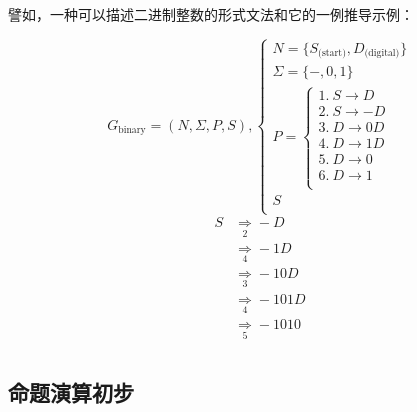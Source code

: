 譬如，一种可以描述二进制整数的形式文法和它的一例推导示例：
\begin{multicols}{2}
    \begin{equation*}
        G_\text{binary} = (N, \Sigma, P, S), \begin{cases}
            N      = \{ S_\text{(start)}, D_\text{(digital)} \} \\
            \Sigma = \{ -, 0, 1 \}                              \\
            P      = \begin{cases}
                         \text{1.}\ S \to D  \\
                         \text{2.}\ S \to -D \\
                         \text{3.}\ D \to 0D \\
                         \text{4.}\ D \to 1D \\
                         \text{5.}\ D \to 0  \\
                         \text{6.}\ D \to 1  \\
                     \end{cases}                                \\
            S                                                   \\
        \end{cases}
    \end{equation*}
    \newline
    \begin{equation*}
        \begin{aligned}
            S &\underset{2}{\Rightarrow} -D    \\
              &\underset{4}{\Rightarrow} -1D   \\
              &\underset{3}{\Rightarrow} -10D  \\
              &\underset{4}{\Rightarrow} -101D \\
              &\underset{5}{\Rightarrow} -1010 \\
        \end{aligned}
    \end{equation*}
\end{multicols}

\subsection{命题演算初步}

